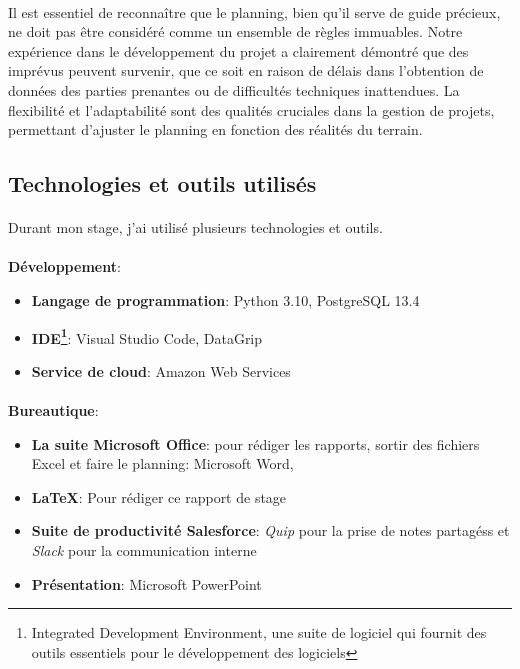 \paragraph{}
\vspace{-2em}
Il est essentiel de reconnaître que le planning, bien qu'il serve de guide précieux, ne doit pas être considéré comme un ensemble de règles immuables. Notre expérience dans le développement du projet a clairement démontré que des imprévus peuvent survenir, que ce soit en raison de délais dans l'obtention de données des parties prenantes ou de difficultés techniques inattendues. La flexibilité et l'adaptabilité sont des qualités cruciales dans la gestion de projets, permettant d'ajuster le planning en fonction des réalités du terrain. 
\subsection{Technologies et outils utilisés}
\paragraph{}
\vspace{-2em}
Durant mon stage, j'ai utilisé plusieurs technologies et outils.\\
\paragraph{}
\vspace{-2em}
\textbf{Développement}:
\begin{itemize}
    \item \textbf{Langage de programmation}: Python 3.10, PostgreSQL 13.4
    \item \textbf{IDE\footnote{Integrated Development Environment, une suite de logiciel qui fournit des outils essentiels pour le développement des logiciels}}: Visual Studio Code, DataGrip
    \item \textbf{Service de cloud}: Amazon Web Services
\end{itemize}

\paragraph{}
\vspace{-2em}
    \textbf{Bureautique}:
    \begin{itemize}
        \item \textbf{La suite Microsoft Office}: pour rédiger les rapports, sortir des fichiers Excel et
        faire le planning: Microsoft Word, 
        \item \textbf{\LaTeX}: Pour rédiger ce rapport de stage
        \item \textbf{Suite de productivité Salesforce}: \textit{Quip} pour la prise de notes partagéss et \textit{Slack} pour la communication interne 
        \item \textbf{Présentation}: Microsoft PowerPoint
    \end{itemize}
